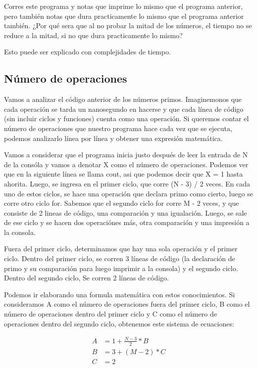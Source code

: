 \documentclass{article}
\begin{document}
Corres este programa y notas que imprime lo mismo que el programa anterior, pero también notas que dura practicamente lo mismo que el programa anterior también. ¿Por qué sera que al no probar la mitad de los números, el tiempo no se reduce a la mitad, si no que dura practicamente lo mismo?

Esto puede ser explicado con complejidades de tiempo.

\subsection{Número de operaciones}

Vamos a analizar el código anterior de los números primos. Imaginemonos que cada operación se tarda un nanosegundo en hacerse y que cada línea de código (sin incluir ciclos y funciones) cuenta como una operación. Si queremos contar el número de operaciones que nuestro programa hace cada vez que se ejecuta, podemos analizarlo línea por línea y obtener una expresión matemática.

Vamos a considerar que el programa inicia justo después de leer la entrada de N de la consóla y vamos a denotar X como el número de operaciones. Podemos ver que en la siguiente línea se llama cout, asi que podemos decir que X = 1 hasta ahorita. Luego, se ingresa en el primer ciclo, que corre (N - 3) / 2 veces. En cada uno de estos ciclos, se hace una operación que declara primo como cierto, luego se corre otro ciclo for. Sabemos que el segundo ciclo for corre M - 2 veces, y que consiste de 2 lineas de código, una comparación y una igualación. Luego, se sale de ese ciclo y se hacen dos operaciónes más, otra comparación y una impresión a la consola.

Fuera del primer ciclo, determinamos que hay una sola operación y el primer ciclo.
Dentro del primer ciclo, se corren 3 líneas de código (la declaración de primo y su comparación para luego imprimir a la consola) y el segundo ciclo.
Dentro del segundo ciclo, Se corren 2 líneas de código.

Podemos ir elaborando una formula matemática con estos conocimientos. Si consideramos A como el número de operaciones fuera del primer ciclo, B como el número de operaciones dentro del primer ciclo y C como el número de operaciones dentro del segundo ciclo, obtenemos este sistema de ecuaciones:

\begin{align}
    A &= 1 + \frac{N - 3}{2} * B \\
    B &= 3 + (M - 2) * C \\
    C &= 2
\end{align}
\end{document}
